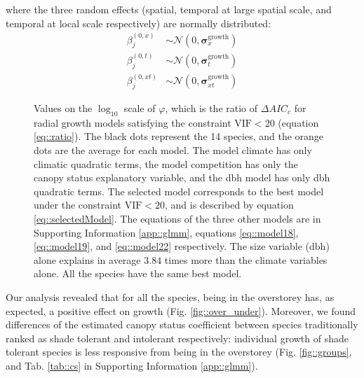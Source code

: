 where the three random effects (spatial, temporal at large spatial scale, and temporal at local scale respectively) are normally distributed:
\begin{align*}
	\beta_{j}^{(0, x)} &\sim \mathcal{N}(0, \bm{\sigma}_{x}^{\text{growth}}) \\
	\beta_{j}^{(0, t)} &\sim \mathcal{N}(0, \bm{\sigma}_{t}^{\text{growth}}) \\
	\beta_{j}^{(0, xt)} &\sim \mathcal{N}(0, \bm{\sigma}_{xt}^{\text{growth}})
\end{align*}

\begin{figure}
	\centering
	
	\caption{Values on the $ \log_{10} $ scale of $ \varphi $, which is the ratio of $ \Delta AIC_c $ for radial growth models satisfying the constraint $ \text{VIF} < 20 $ (equation \eqref{eq::ratio}). The black dots represent the 14 species, and the orange dots are the average for each model. The model climate has only climatic quadratic terms, the model competition has only the canopy status explanatory variable, and the dbh model has only dbh quadratic terms. The selected model corresponds to the best model under the constraint $ \text{VIF} < 20 $, and is described by equation \eqref{eq::selectedModel}. The equations of the three other models are in Supporting Information \ref{app::glmm}, equations \eqref{eq::model18}, \eqref{eq::model19}, and \eqref{eq::model22} respectively. The size variable (dbh) alone explains in average $ 3.84 $ times more than the climate variables alone. All the species have the same best model. \label{fig::delta_aic}}
\end{figure}

Our analysis revealed that for all the species, being in the overstorey has, as
expected, a positive effect on growth (Fig. \ref{fig::over_under}). Moreover, we found differences of the
estimated canopy status coefficient between species traditionally ranked as
shade tolerant and intolerant respectively: individual growth of shade
tolerant species is less responsive from being in the overstorey (Fig.
\ref{fig::groups}, and Tab. \ref{tab::cs} in Supporting Information
\ref{app::glmm}).

